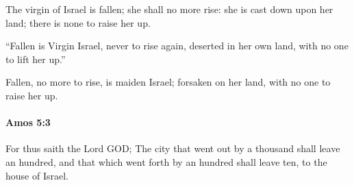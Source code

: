 			\begin{versebox}
					\item[BHS] 
					\item[LXX] 
					\item[ASV] The virgin of Israel is fallen; she shall no more rise: she is cast down upon her land; there is none to raise her up.
					\item[NIV] “Fallen is Virgin Israel, never to rise again, deserted in her own land, with no one to lift her up.”
					\item[NRSV] Fallen, no more to rise, is maiden Israel; forsaken on her land, with no one to raise her up.
			\end{versebox}

		\paragraph{Amos 5:3} %
			\label{AMOS-5-3}

			For thus saith the Lord GOD; The city that went out by a thousand shall leave an hundred, and that which went forth by an hundred shall leave ten, to the house of Israel.

